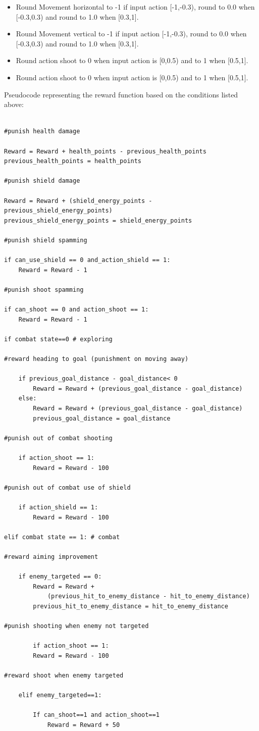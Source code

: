 \documentclass[a4paper,one side,12pt]{book}
\begin{document}
\begin{itemize}
\item
  Round Movement horizontal to -1 if input action [-1,-0.3), round to 0.0 when [-0.3,0.3) and round to 1.0 when [0.3,1].
\item
  Round Movement vertical to -1 if input action [-1,-0.3), round to 0.0 when [-0.3,0.3) and round to 1.0 when [0.3,1].
\item
  Round action shoot to 0 when input action is [0,0.5) and to 1 when [0.5,1].
\item
  Round action shoot to 0 when input action is [0,0.5) and to 1 when [0.5,1].
\end{itemize}

Pseudocode representing the reward function based on the conditions
listed above:

\begin{verbatim}

#punish health damage

Reward = Reward + health_points - previous_health_points
previous_health_points = health_points

#punish shield damage

Reward = Reward + (shield_energy_points - previous_shield_energy_points)
previous_shield_energy_points = shield_energy_points

#punish shield spamming

if can_use_shield == 0 and_action_shield == 1:
    Reward = Reward - 1

#punish shoot spamming

if can_shoot == 0 and action_shoot == 1:
    Reward = Reward - 1

if combat state==0 # exploring

#reward heading to goal (punishment on moving away)

    if previous_goal_distance - goal_distance< 0
        Reward = Reward + (previous_goal_distance - goal_distance)
    else:
        Reward = Reward + (previous_goal_distance - goal_distance)
        previous_goal_distance = goal_distance

#punish out of combat shooting

    if action_shoot == 1:
        Reward = Reward - 100

#punish out of combat use of shield

    if action_shield == 1:
        Reward = Reward - 100

elif combat state == 1: # combat

#reward aiming improvement

    if enemy_targeted == 0:
        Reward = Reward +
            (previous_hit_to_enemy_distance - hit_to_enemy_distance)
        previous_hit_to_enemy_distance = hit_to_enemy_distance

#punish shooting when enemy not targeted

        if action_shoot == 1:
        Reward = Reward - 100

#reward shoot when enemy targeted

    elif enemy_targeted==1:

        If can_shoot==1 and action_shoot==1
            Reward = Reward + 50
\end{verbatim}
\end{document}
